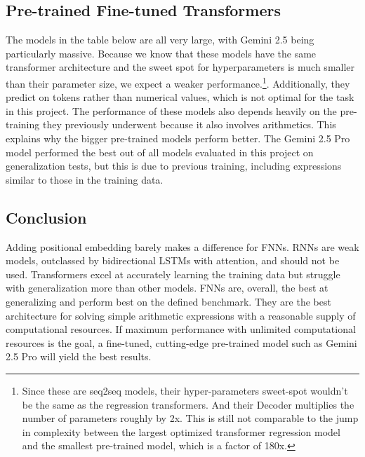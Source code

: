 \documentclass{article}
\begin{document}
\subsection{Pre-trained Fine-tuned Transformers}
The models in the table below are all very large, with Gemini 2.5 being particularly massive. Because we know that these models have the same transformer architecture and the sweet spot for hyperparameters is much smaller than their parameter size, we expect a weaker performance.\footnote{Since these are seq2seq models, their hyper-parameters sweet-spot wouldn't be the same as the regression transformers. And their Decoder multiplies the number of parameters roughly by 2x. This is still not comparable to the jump in complexity between the largest optimized transformer regression model and the smallest pre-trained model, which is a factor of 180x.}. Additionally, they predict on tokens rather than numerical values, which is not optimal for the task in this project. The performance of these models also depends heavily on the pre-training they previously underwent because it also involves arithmetics. This explains why the bigger pre-trained models perform better. The Gemini 2.5 Pro model performed the best out of all models evaluated in this project on generalization tests, but this is due to previous training, including expressions similar to those in the training data.

\subsection{Conclusion}
Adding positional embedding barely makes a difference for FNNs.
RNNs are weak models, outclassed by bidirectional LSTMs with attention, and should not be used.
Transformers excel at accurately learning the training data but struggle with generalization more than other models.
FNNs are, overall, the best at generalizing and perform best on the defined benchmark. They are the best architecture for solving simple arithmetic expressions with a reasonable supply of computational resources.
If maximum performance with unlimited computational resources is the goal, a fine-tuned, cutting-edge pre-trained model such as Gemini 2.5 Pro will yield the best results.
\end{document}
